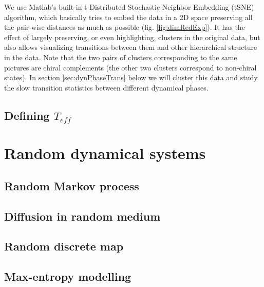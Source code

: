 \documentclass[reprint,prx]{revtex4-1}
\renewcommand{\=}[1]{\stackrel{#1}{=}} %
\renewcommand{\(}{\left (}
\renewcommand{\)}{\right  )}
\renewcommand{\[}{\left [}
\renewcommand{\]}{\right ]}
\newcommand{\<}{\left <}
\renewcommand{\>}{\right >}
\theoremstyle{definition}
\theoremstyle{remark}
\begin{document}
We use Matlab's built-in t-Distributed Stochastic Neighbor Embedding (tSNE) algorithm, which basically tries to embed the data in a 2D space preserving all the pair-wise distances as much as possible (fig. \ref{fig:dimRedExp}). It has the effect of largely preserving, or even highlighting, clusters in the original data, but also allows visualizing transitions between them and other hierarchical structure in the data. Note that the two pairs of clusters corresponding to the same pictures are chiral complements (the other two clusters correspond to non-chiral states). In section \ref{sec:dynPhaseTrans} below we will cluster this data and study the slow transition statistics between different dynamical phases.

\subsection{Defining $ T_{eff} $} \label{app:defRatt}

\section{Random dynamical systems}
\subsection{Random Markov process}
\subsection{Diffusion in random medium}
\subsection{Random discrete map}
\subsection{Max-entropy modelling}


%

\end{document}
